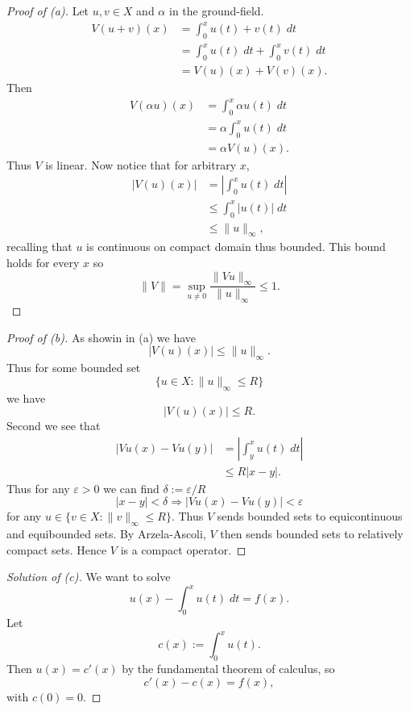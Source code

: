 \begin{proof}[Proof of (a)]
    Let $u,v \in X$ and $\alpha$ in the ground-field. 
    \begin{align*}
        V(u + v)(x)
        &= \int_0^x u(t) + v(t) \; dt \\ 
        &= \int_0^x u(t) \; dt + \int_0^x v(t) \; dt \\ 
        &= V(u)(x) + V(v)(x). 
    \end{align*}
    Then 
    \begin{align*}
        V(\alpha u)(x)  
        &= \int_0^x \alpha u(t) \; dt \\ 
        &= \alpha \int_0^x u(t) \; dt \\ 
        &= \alpha V(u)(x). 
     \end{align*}
     Thus $V$ is linear. 
     Now notice that for arbitrary $x$, 
    \begin{align*}
         |V(u)(x)| 
         &= \left|\int_0^x u(t) \; dt\right| \\ 
         &\leq \int_0^x |u(t)| \; dt \\ 
         &\leq \|u\|_\infty, 
    \end{align*}
    recalling that $u$ is continuous on 
    compact domain thus bounded. This bound 
    holds for every $x$ so 
    \[
        \|V\| = \sup_{u \neq 0}
        \frac{\|Vu\|_\infty}{\|u\|_\infty} \leq 1.
    \]
\end{proof}

\begin{proof}[Proof of (b)]
    As showin in (a) we have 
    \[
        |V(u)(x)| \leq \|u\|_\infty. 
    \]
    Thus for some bounded set 
    \[
        \{u \in X : \|u\|_\infty \leq R\}
    \]
    we have 
    \[
        |V(u)(x)| \leq R. 
    \]
    Second we see that 
    \begin{align*}
        |Vu(x) - Vu(y)| 
        &= \left|\int_y^x u(t) \; dt\right|
        \\ 
        &\leq R|x-y|. 
    \end{align*}
    Thus for any $\varepsilon > 0$ we can find 
    $\delta := \varepsilon / R$ 
    \[
        |x-y| < \delta \Rightarrow 
        |Vu(x) - Vu(y)| < \varepsilon
    \]
    for any $u \in \{v \in X : \|v\|_\infty \leq R\}$. 
    Thus $V$ sends bounded sets to equicontinuous 
    and equibounded sets. By Arzela-Ascoli, $V$ then 
    sends bounded sets to relatively compact sets. 
    Hence $V$ is a compact operator. 
\end{proof}
\begin{proof}[Solution of (c)]
    We want to solve 
    \[
        u(x) - \int_0^x u(t) \; dt = f(x). 
    \]
    Let 
    \[
        c(x) := \int_0^x u(t).    
    \]
    Then $u(x) = c'(x)$ by the fundamental theorem of 
    calculus, so 
    \[
        c'(x) - c(x) = f(x), 
    \]
    with $c(0) = 0$. 
\end{proof}

